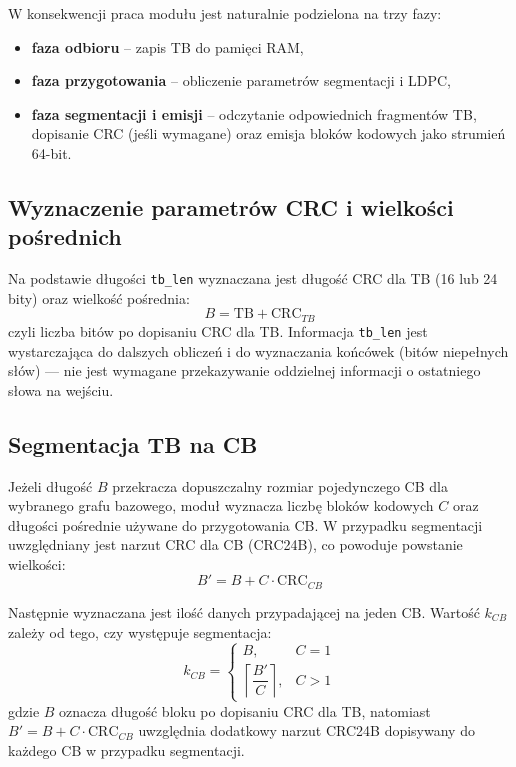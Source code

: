 W konsekwencji praca modułu jest naturalnie podzielona na trzy fazy:
\begin{itemize}
  \item \textbf{faza odbioru} -- zapis TB do pamięci RAM,
  \item \textbf{faza przygotowania} -- obliczenie parametrów segmentacji i LDPC,
  \item \textbf{faza segmentacji i emisji} -- odczytanie odpowiednich fragmentów TB, dopisanie CRC (jeśli wymagane) oraz emisja bloków kodowych jako strumień 64-bit.
\end{itemize}

\subsection{Wyznaczenie parametrów CRC i wielkości pośrednich}
\label{subsec:ldpc_prep_crc_b}

Na podstawie długości \texttt{tb\_len} wyznaczana jest długość CRC dla TB (16 lub 24 bity) oraz wielkość pośrednia:
\[
B = \mathrm{TB} + \mathrm{CRC}_{TB}
\]
czyli liczba bitów po dopisaniu CRC dla TB. Informacja \texttt{tb\_len} jest wystarczająca do dalszych obliczeń i do wyznaczania końcówek (bitów niepełnych słów) --- nie jest wymagane przekazywanie oddzielnej informacji o  ostatniego słowa na wejściu.

\subsection{Segmentacja TB na CB}
\label{subsec:ldpc_prep_segmentation}

Jeżeli długość $B$ przekracza dopuszczalny rozmiar pojedynczego CB dla wybranego grafu bazowego, moduł wyznacza liczbę bloków kodowych $C$ oraz długości pośrednie używane do przygotowania CB. W przypadku segmentacji uwzględniany jest narzut CRC dla CB (CRC24B), co powoduje powstanie wielkości:
\[
B' = B + C \cdot \mathrm{CRC}_{CB}
\]

Następnie wyznaczana jest ilość danych przypadającej na jeden CB. Wartość $k_{CB}$ zależy od tego, czy występuje segmentacja:
\[
k_{CB} =
\begin{cases}
B, & C = 1 \\
\left\lceil \dfrac{B'}{C} \right\rceil, & C > 1
\end{cases}
\]
gdzie $B$ oznacza długość bloku po dopisaniu CRC dla TB, natomiast $B' = B + C \cdot \mathrm{CRC}_{CB}$ uwzględnia dodatkowy narzut CRC24B dopisywany do każdego CB w przypadku segmentacji.


